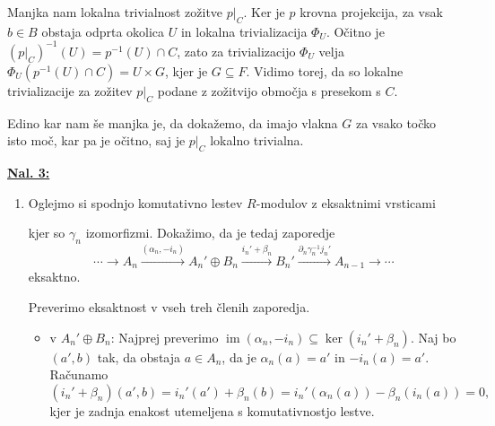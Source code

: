 \documentclass[a4paper, 12pt]{article}
\DeclareMathOperator{\im}{im}
\begin{document}
\begin{enumerate}[label=(\alph*)]
	Manjka nam lokalna trivialnost zožitve $p|_C$. Ker je $p$ krovna projekcija, za vsak $b \in B$ obstaja odprta okolica $U$ in lokalna trivializacija $\Phi_U$. Očitno je $(p|_C)^{-1}(U) = p^{-1}(U) \cap C$, zato za trivializacijo $\Phi_U$ velja $\Phi_U(p^{-1}(U) \cap C) = U \times G$, kjer je $G \subseteq F$. Vidimo torej, da so lokalne trivializacije za zožitev $p|_C$ podane z zožitvijo območja s presekom s $C$.
	
	Edino kar nam še manjka je, da dokažemo, da imajo vlakna $G$ za vsako točko isto moč, kar pa je očitno, saj je $p|_C$ lokalno trivialna.
\end{enumerate}

\underline{\textbf{Nal. 3:}}
\begin{enumerate}[label=(\alph*)]
	\item Oglejmo si spodnjo komutativno lestev $R$-modulov z eksaktnimi vrsticami
	
	kjer so $\gamma_n$ izomorfizmi. Dokažimo, da je tedaj zaporedje
	\[
	\cdots \xrightarrow{} A_n \xrightarrow{(\alpha_n, -i_n)} A_n' \oplus B_n \xrightarrow{i_n' + \beta_n} B_n' \xrightarrow{\partial_n\gamma_n^{-1}j_n'} A_{n-1} \xrightarrow{} \cdots
	\]
	eksaktno.
	
	Preverimo eksaktnost v vseh treh členih zaporedja.
	\begin{itemize}
		\item v $A_n' \oplus B_n$: Najprej preverimo $\im (\alpha_n, -i_n) \subseteq \ker (i_n'+\beta_n)$. Naj bo $(a', b)$ tak, da obstaja $a \in A_n$, da je $\alpha_n(a) = a'$ in $-i_n(a) = a'$. Računamo
		\[
		(i_n' + \beta_n)(a',  b) = i_n'(a') + \beta_n(b) = i_n'(\alpha_n(a)) - \beta_n(i_n(a)) = 0,
		\]
		kjer je zadnja enakost utemeljena s komutativnostjo lestve.
		

\end{itemize}
\end{enumerate}
\end{document}
